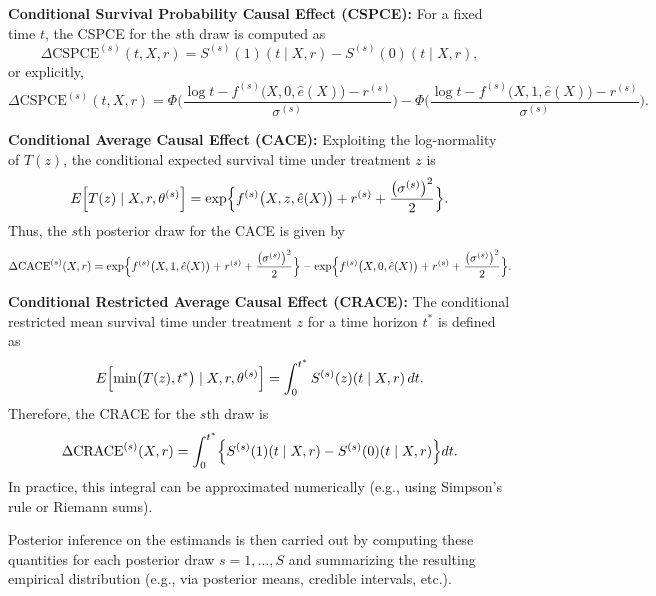 \documentclass[useAMS,referee]{biom}
\begin{document}
\textbf{Conditional Survival Probability Causal Effect (CSPCE):}  
For a fixed time \(t\), the CSPCE for the \(s\)th draw is computed as
\[
\Delta \text{CSPCE}^{(s)}(t, X, r) = S^{(s)}(1)(t\mid X,r) - S^{(s)}(0)(t\mid X,r),
\]
or explicitly,
\[
\Delta \text{CSPCE}^{(s)}(t, X, r) = \Phi\Biggl(\frac{\log t - f^{(s)}\bigl(X,0,\hat{e}(X)\bigr) - r^{(s)}}{\sigma^{(s)}}\Biggr) - \Phi\Biggl(\frac{\log t - f^{(s)}\bigl(X,1,\hat{e}(X)\bigr) - r^{(s)}}{\sigma^{(s)}}\Biggr).
\]

\textbf{Conditional Average Causal Effect (CACE):}  
Exploiting the log-normality of \(T(z)\), the conditional expected survival time under treatment \(z\) is
\[
E\Bigl[T(z) \mid X,r,\theta^{(s)}\Bigr] = \exp\Bigl\{ f^{(s)}\bigl(X,z,\hat{e}(X)\bigr) + r^{(s)} + \frac{\bigl(\sigma^{(s)}\bigr)^2}{2} \Bigr\}.
\]
Thus, the \(s\)th posterior draw for the CACE is given by
\[
\Delta \text{CACE}^{(s)}(X, r) = \exp\Bigl\{ f^{(s)}\bigl(X,1,\hat{e}(X)\bigr) + r^{(s)} + \frac{\bigl(\sigma^{(s)}\bigr)^2}{2} \Bigr\} - \exp\Bigl\{ f^{(s)}\bigl(X,0,\hat{e}(X)\bigr) + r^{(s)} + \frac{\bigl(\sigma^{(s)}\bigr)^2}{2} \Bigr\}.
\]

\textbf{Conditional Restricted Average Causal Effect (CRACE):}  
The conditional restricted mean survival time under treatment \(z\) for a time horizon \(t^*\) is defined as
\[
E\Bigl[\min\bigl(T(z),t^*\bigr) \mid X,r,\theta^{(s)}\Bigr] = \int_{0}^{t^*} S^{(s)}(z)(t\mid X,r) \, dt.
\]
Therefore, the CRACE for the \(s\)th draw is
\[
\Delta \text{CRACE}^{(s)}(X, r) = \int_{0}^{t^*} \Bigl\{ S^{(s)}(1)(t\mid X,r) - S^{(s)}(0)(t\mid X,r) \Bigr\} dt.
\]
In practice, this integral can be approximated numerically (e.g., using Simpson's rule or Riemann sums).

Posterior inference on the estimands is then carried out by computing these quantities for each posterior draw \(s=1,\ldots,S\) and summarizing the resulting empirical distribution (e.g., via posterior means, credible intervals, etc.).
\end{document}
